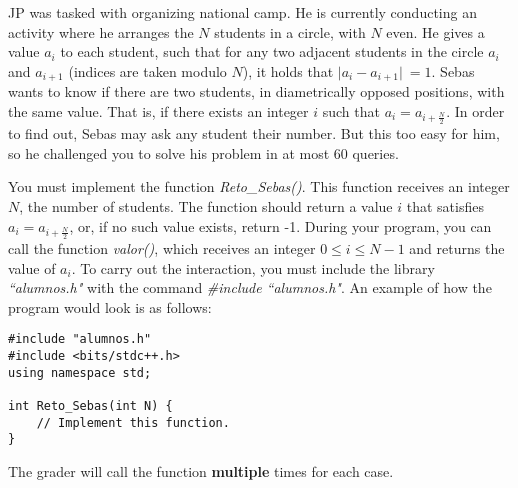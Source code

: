 \documentclass[12pt]{scrartcl}
\begin{document}
    

        JP was tasked with organizing national camp. He is currently conducting an activity where he arranges the $N$ students in a circle, with $N$ even. He gives a value $a_i$ to each student, such that for any two adjacent students in the circle $a_i$ and $a_{i + 1}$ (indices are taken modulo $N$), it holds that $\lvert a_i - a_{i + 1} \lvert \ = 1$. Sebas wants to know if there are two students, in diametrically opposed positions, with the same value. That is, if there exists an integer $i$ such that $a_{i} = a_{i + \frac{N}{2}}$. In order to find out, Sebas may ask any student their number. But this too easy for him, so he challenged you to solve his problem in at most 60 queries.
    

       You must implement the function {\itshape Reto\_Sebas()}. This function receives an integer $N$, the number of students. The function should return a value $i$ that satisfies $a_i = a_{i + \frac{N}{2}}$, or, if no such value exists, return -1. During your program, you can call the function {\itshape valor()}, which receives an integer $0 \le i \le N - 1$ and returns the value of $a_i$. To carry out the interaction, you must include the library \textit{``alumnos.h"} with the command \textit{\#include ``alumnos.h"}.
       An example of how the program would look is as follows:
    

\begin{verbatim}
#include "alumnos.h"
#include <bits/stdc++.h>
using namespace std;

int Reto_Sebas(int N) {
    // Implement this function.
}
\end{verbatim}

    The grader will call the function \textbf{multiple} times for each case.

    
\end{document}
